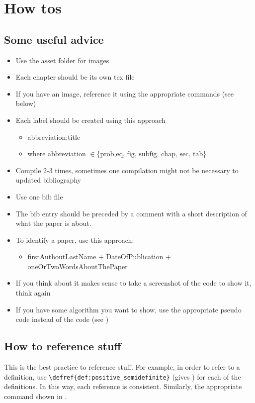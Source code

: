 \chapter{How tos}\label{chap:how_tos}


\section{Some useful advice}
\begin{itemize}
	\item Use the asset folder for images
	\item Each chapter should be its own tex file
	\item If you have an image, reference it using the appropriate commands (see below)
	\item Each label should be created using this approach
	\begin{itemize}
		\item[] abbreviation:title
		\item[] where abbreviation $\in \{\text{prob,eq, fig, subfig, chap, sec, tab}\}$
	\end{itemize}
		\item Compile 2-3 times, sometimes one compilation might not be necessary to updated bibliography
	\item Use one bib file
	\item The bib entry should be preceded by a comment with a short description of what the paper is about. 
	\item To identify a paper, use this approach:
			\begin{itemize}
				\item[] firstAuthoutLastName + DateOfPublication + oneOrTwoWordsAboutThePaper
			\end{itemize}
	\item If you think about it makes sense to take a screenshot of the code to show it, think again
	\item If you have some algorithm you want to show, use the appropriate pseudo code instead of the code (see )
\end{itemize}




\section{How to reference stuff}\label{sec:general_definitions}
This is the best practice to reference stuff. For example, in order to refer to a definition, use \verb|\defref{def:positive_semidefinite}| (gives ) for each of the definitions. In this way, each reference is consistent. Similarly, the appropriate command shown in .

